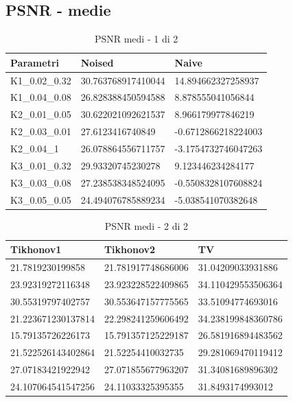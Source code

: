 \documentclass[12pt]{article}
\begin{document}
    \subsection{PSNR - medie}

    \begin{table}[!ht]
    \centering
    \begin{tabular}{|l|l|l|}
    \hline
        Parametri & Noised & Naive \\ \hline
        K1\_0.02\_0.32 & 30.763768917410044 & 14.894662327258937 \\ \hline
        K1\_0.04\_0.08 & 26.828388450594588 & 8.878555041056844 \\ \hline
        K2\_0.01\_0.05 & 30.622021092621537 & 8.966179977846219 \\ \hline
        K2\_0.03\_0.01 & 27.6123416740849 & -0.6712866218224003 \\ \hline
        K2\_0.04\_1 & 26.078864556711757 & -3.1754732746047263 \\ \hline
        K3\_0.01\_0.32 & 29.93320745230278 & 9.123446234284177 \\ \hline
        K3\_0.03\_0.08 & 27.238538348524095 & -0.5508328107608824 \\ \hline
        K3\_0.05\_0.05 & 24.494076785889234 & -5.038541070382648 \\ \hline
    \end{tabular}
    \caption{PSNR medi - 1 di 2}
    \label{table:6}
    \end{table}

    \begin{table}[!ht]
    \centering
    \begin{tabular}{|l|l|l|}
    \hline
        Tikhonov1 & Tikhonov2 & TV \\ \hline
        21.7819230199858 & 21.781917748686006 & 31.04209033931886 \\ \hline
        23.92319272116348 & 23.923228522409865 & 34.110429553506364 \\ \hline
        30.55319797402757 & 30.553647157775565 & 33.51094774693016 \\ \hline
        21.223671230137814 & 22.298241259606492 & 34.238199848360786 \\ \hline
        15.79135726226173 & 15.791357125229187 & 26.581916894483562 \\ \hline
        21.522526143402864 & 21.52254410032735 & 29.281069470119412 \\ \hline
        27.07183421922942 & 27.071855677963207 & 31.34081689896302 \\ \hline
        24.107064541547256 & 24.11033325395355 & 31.8493174993012 \\ \hline
    \end{tabular}
    \caption{PSNR medi - 2 di 2}
    \label{table:7}
    \end{table}
\end{document}
